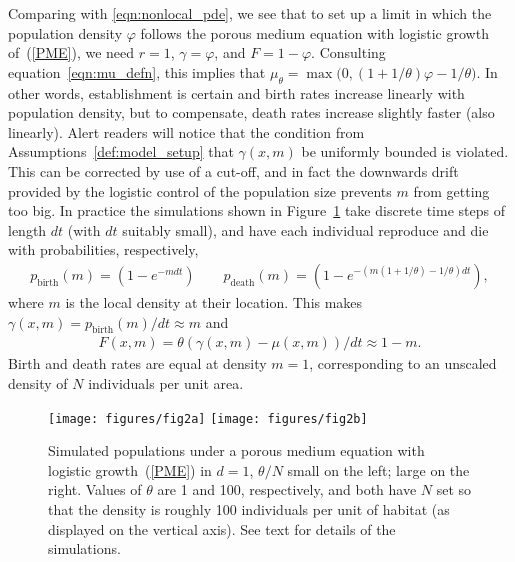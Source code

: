 \documentclass[12pt]{article}
\numberwithin{equation}{section}
\begin{document}
Comparing %
with \eqref{eqn:nonlocal_pde},
we see that to set up a limit in which the population density $\varphi$ follows the 
porous medium equation with logistic growth of~(\ref{PME}),
we need $r=1$,
$\gamma = \varphi$, and $F = 1 - \varphi$.
Consulting equation~\eqref{eqn:mu_defn},
this implies that $\mu_\theta = \max\big(0, (1 + 1/\theta) \varphi - 1/\theta\big)$.
In other words,
establishment is certain
and birth rates increase linearly with population density,
but to compensate, death rates increase slightly faster (also linearly).
Alert readers will notice that
the condition from Assumptions~\ref{def:model_setup} 
that $\gamma(x,m)$ be uniformly bounded 
is violated.
This can be corrected by use of a cut-off, and in fact the downwards drift
provided by the logistic control of the population size prevents $m$ from 
getting too big. 
In practice the simulations shown in Figure~\ref{fig:pme_waves}
take discrete time steps of length $dt$ (with $dt$ suitably small),
and have each individual reproduce and die with probabilities, respectively,
\begin{align*}
    p_\text{birth}(m) = \left(1 - e^{- m dt}\right)
    \qquad 
    p_\text{death}(m) = \left(1 - e^{- (m (1+1/\theta) - 1/\theta) dt} \right) ,
\end{align*}
where $m$ is the local density at their location.
This makes $\gamma(x, m) = p_\text{birth}(m)/dt \approx m$
and
\begin{align*}
    F(x, m) = \theta(\gamma(x, m) - \mu(x, m)) / dt \approx 1 - m .
\end{align*}
Birth and death rates are equal at density $m = 1$,
corresponding to an unscaled density of $N$ individuals per unit area.

\begin{figure}
    \begin{center}
        \texttt{[image: figures/fig2a]}
        \texttt{[image: figures/fig2b]}
    \end{center}
    \caption{
        Simulated populations under a porous medium equation with logistic growth~(\ref{PME}) in $d=1$,
        $\theta/N$ small on the left; large on the right.
        Values of $\theta$ are 1 and 100, respectively, and both have $N$ set
        so that the density is roughly 100 individuals per unit of habitat
        (as displayed on the vertical axis).
        See text for details of the simulations.
        \label{fig:pme_waves}
    }
\end{figure}
\end{document}
